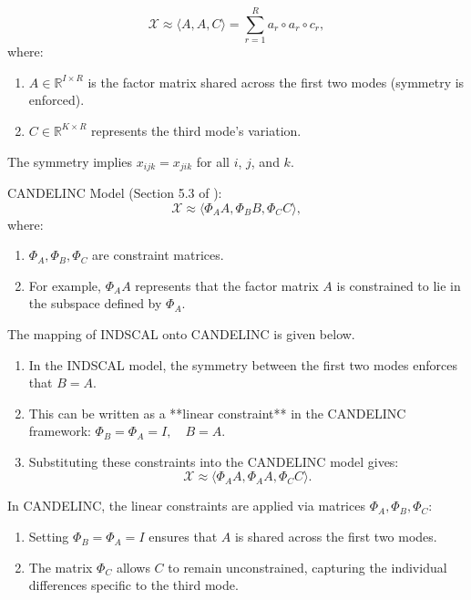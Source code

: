    \begin{equation}
       \mathcal{X} \approx \langle A, A, C \rangle = \sum_{r=1}^{R} a_r \circ a_r \circ c_r,
   \end{equation}
   where:

   \begin{enumerate}
       \item $A \in \mathbb{R}^{I \times R}$ is the factor matrix shared across the first two modes (symmetry is enforced).
       \item $C \in \mathbb{R}^{K \times R}$ represents the third mode's variation.
   \end{enumerate}

The symmetry implies $x_{ijk} = x_{jik}$ for all $i$, $j$, and $k$.

CANDELINC Model (Section 5.3 of \cite{kolda2009tensor}):
   \begin{equation}
       \mathcal{X} \approx \langle \Phi_A A, \Phi_B B, \Phi_C C \rangle,
   \end{equation}
   where:

   \begin{enumerate}
       \item $\Phi_A, \Phi_B, \Phi_C$ are constraint matrices.
       \item For example, $\Phi_A A$ represents that the factor matrix $A$ is constrained to lie in the subspace defined by $\Phi_A$.
   \end{enumerate}




The mapping of INDSCAL onto CANDELINC is given below.
\begin{enumerate}
    \item  In the INDSCAL model, the symmetry between the first two modes enforces that $B = A$.
    \item This can be written as a **linear constraint** in the CANDELINC framework: $\Phi_B = \Phi_A = I, \quad B = A$.
  \item Substituting these constraints into the CANDELINC model gives:
  \begin{equation}
      \mathcal{X} \approx \langle \Phi_A A, \Phi_A A, \Phi_C C \rangle.
  \end{equation}
\end{enumerate}


In CANDELINC, the linear constraints are applied via matrices $\Phi_A, \Phi_B, \Phi_C$:

\begin{enumerate}
    \item Setting $\Phi_B = \Phi_A = I$ ensures that $A$ is shared across the first two modes.
    \item The matrix $\Phi_C$ allows $C$ to remain unconstrained, capturing the individual differences specific to the third mode.
\end{enumerate}

